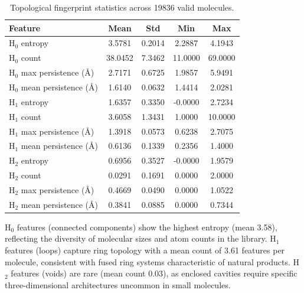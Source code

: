 \documentclass[11pt,a4paper]{article}
\begin{document}
\begin{table}[htbp]
\centering
\caption{Topological fingerprint statistics across \num{19836} valid molecules.}
\label{tab:tda_stats}
\begin{tabularx}{0.7\textwidth}{l S[table-format=1.4] S[table-format=1.4] S[table-format=1.4] S[table-format=1.4]}
\toprule
Feature & {Mean} & {Std} & {Min} & {Max} \\
\midrule
H$_0$ entropy & 3.5781 & 0.2014 & 2.2887 & 4.1943 \\
H$_0$ count & 38.0452 & 7.3462 & 11.0000 & 69.0000 \\
H$_0$ max persistence (\si{\angstrom}) & 2.7171 & 0.6725 & 1.9857 & 5.9491 \\
H$_0$ mean persistence (\si{\angstrom}) & 1.6140 & 0.0632 & 1.4414 & 2.0281 \\
\midrule
H$_1$ entropy & 1.6357 & 0.3350 & -0.0000 & 2.7234 \\
H$_1$ count & 3.6058 & 1.3431 & 1.0000 & 10.0000 \\
H$_1$ max persistence (\si{\angstrom}) & 1.3918 & 0.0573 & 0.6238 & 2.7075 \\
H$_1$ mean persistence (\si{\angstrom}) & 0.6136 & 0.1339 & 0.2356 & 1.4000 \\
\midrule
H$_2$ entropy & 0.6956 & 0.3527 & -0.0000 & 1.9579 \\
H$_2$ count & 0.0291 & 0.1691 & 0.0000 & 2.0000 \\
H$_2$ max persistence (\si{\angstrom}) & 0.4669 & 0.0490 & 0.0000 & 1.0522 \\
H$_2$ mean persistence (\si{\angstrom}) & 0.3841 & 0.0885 & 0.0000 & 0.7344 \\
\bottomrule
\end{tabularx}
\end{table}

H$_0$ features (connected components) show the highest entropy (mean 3.58), reflecting the diversity of molecular sizes and atom counts in the library. H$_1$ features (loops) capture ring topology with a mean count of 3.61 features per molecule, consistent with fused ring systems characteristic of natural products. H$_2$ features (voids) are rare (mean count 0.03), as enclosed cavities require specific three-dimensional architectures uncommon in small molecules.
\end{document}
